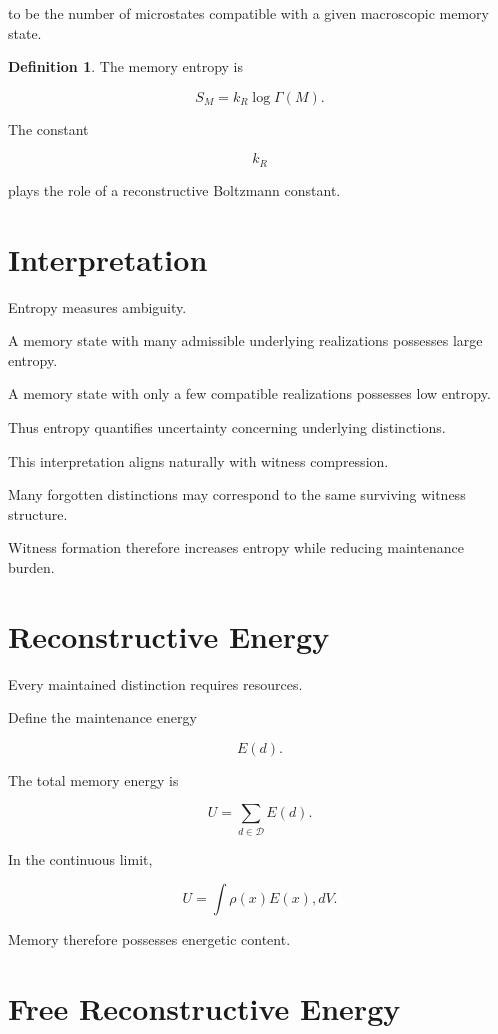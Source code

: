 \documentclass[12pt,oneside]{book}
\theoremstyle{plain} \newtheorem{theorem}{Theorem}[chapter] \newtheorem{lemma}[theorem]{Lemma} \newtheorem{proposition}[theorem]{Proposition} \newtheorem{corollary}[theorem]{Corollary}
\theoremstyle{definition} \newtheorem{definition}[theorem]{Definition} \newtheorem{axiom}[theorem]{Axiom} \newtheorem{construction}[theorem]{Construction}
\theoremstyle{remark} \newtheorem{remark}[theorem]{Remark} \newtheorem{example}[theorem]{Example}
\newcommand{\D}{\mathcal{D}} \newcommand{\R}{\mathcal{R}} \newcommand{\F}{\mathcal{F}} \newcommand{\U}{\mathcal{U}} \newcommand{\M}{\mathcal{M}} \newcommand{\G}{\Gamma}
\begin{document}
to be the number of microstates compatible with a given macroscopic memory state.

\begin{definition}

The memory entropy is

\[
S_M
=
k_R
\log \Gamma(M).
\]

\end{definition}

The constant

\[
k_R
\]

plays the role of a reconstructive Boltzmann constant.

\section{Interpretation}

Entropy measures ambiguity.

A memory state with many admissible underlying realizations possesses large entropy.

A memory state with only a few compatible realizations possesses low entropy.

Thus entropy quantifies uncertainty concerning underlying distinctions.

This interpretation aligns naturally with witness compression.

Many forgotten distinctions may correspond to the same surviving witness structure.

Witness formation therefore increases entropy while reducing maintenance burden.

\section{Reconstructive Energy}

Every maintained distinction requires resources.

Define the maintenance energy

\[
E(d).
\]

The total memory energy is

\[
U
=
\sum_{d\in\D}
E(d).
\]

In the continuous limit,

\[
U
=
\int
\rho(x)
E(x)
,dV.
\]

Memory therefore possesses energetic content.

\section{Free Reconstructive Energy}
\end{document}
